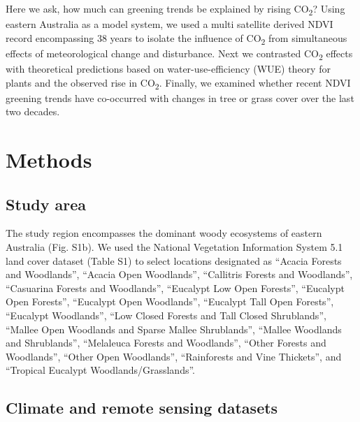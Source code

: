\documentclass[gc, manuscript]{copernicus}
\begin{document}
Here we ask, how much can greening trends be explained by rising
CO\textsubscript{2}? Using eastern Australia as a model system, we used
a multi satellite derived NDVI record encompassing 38 years to isolate
the influence of CO\textsubscript{2} from simultaneous effects of
meteorological change and disturbance. Next we contrasted
CO\textsubscript{2} effects with theoretical predictions based on
water-use-efficiency (WUE) theory for plants and the observed rise in
CO\textsubscript{2}. Finally, we examined whether recent NDVI greening
trends have co-occurred with changes in tree or grass cover over the
last two decades.

\section{Methods}

\subsection{Study area}

The study region encompasses the dominant woody ecosystems of eastern
Australia (Fig. S1b). We used the National Vegetation Information System
5.1 land cover dataset (Table S1) to select locations designated as
``Acacia Forests and Woodlands'', ``Acacia Open Woodlands'', ``Callitris
Forests and Woodlands'', ``Casuarina Forests and Woodlands'', ``Eucalypt
Low Open Forests'', ``Eucalypt Open Forests'', ``Eucalypt Open
Woodlands'', ``Eucalypt Tall Open Forests'', ``Eucalypt Woodlands'',
``Low Closed Forests and Tall Closed Shrublands'', ``Mallee Open
Woodlands and Sparse Mallee Shrublands'', ``Mallee Woodlands and
Shrublands'', ``Melaleuca Forests and Woodlands'', ``Other Forests and
Woodlands'', ``Other Open Woodlands'', ``Rainforests and Vine
Thickets'', and ``Tropical Eucalypt Woodlands/Grasslands''.

\subsection{Climate and remote sensing datasets}
\end{document}
